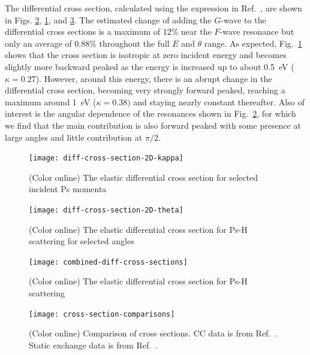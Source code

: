 \documentclass[preprint,showpacs,showkeys,preprintnumbers,amsmath,amssymb,longbibliography,pra,aps]{revtex4-1}
\begin{document}
The differential cross section, calculated using the expression in
Ref.~\cite{Bransden2003}, are shown in Figs.
\ref{fig:diff-cross-section-2D-theta}, \ref{fig:diff-cross-section-2D-kappa},
and \ref{fig:combined-diff-cross-sections}. The estimated change of adding
the $G$-wave to the differential cross sections is a maximum of $12\%$ near
the $F$-wave resonance but only an average of $0.88\%$ throughout the full
$E$ and $\theta$ range. As expected, 
Fig.~\ref{fig:diff-cross-section-2D-kappa} shows that the cross section is 
isotropic at zero incident energy and becomes slightly more backward peaked 
as the energy is increased up to about \mbox{0.5 eV} ($\kappa = 0.27$). 
However, around this energy, there is an abrupt change in the differential 
cross section, becoming very strongly forward peaked, reaching a maximum 
around \mbox{1 eV} ($\kappa = 0.38)$ and staying nearly constant thereafter. 
Also of interest is the angular dependence of the resonances shown in
Fig.~\ref{fig:diff-cross-section-2D-theta}, for which we find that the main 
contribution is also forward peaked with some presence at large angles and 
little contribution at $\pi/2$.

\begin{figure}[H]
	\centering
	\texttt{[image: diff-cross-section-2D-kappa]}
	\caption{(Color online) The elastic differential cross section for selected
incident Ps momenta}
	\label{fig:diff-cross-section-2D-kappa}
\end{figure}

\begin{figure}[H]
	\centering
	\texttt{[image: diff-cross-section-2D-theta]}
	\caption{(Color online) The elastic differential cross section for Ps-H
scattering for selected angles}
	\label{fig:diff-cross-section-2D-theta}
\end{figure}

\begin{figure}[H]
	\centering
	\texttt{[image: combined-diff-cross-sections]}
	\caption{(Color online) The elastic differential cross section for Ps-H
scattering}
	\label{fig:combined-diff-cross-sections}
\end{figure}

\begin{figure}[H]
	\centering
	\texttt{[image: cross-section-comparisons]}
	\caption{(Color online) Comparison of cross sections. CC data is from
Ref.~\cite{Blackwood2002}. Static exchange data is from Ref.~\cite{Hara1975}.}
	\label{fig:cross-section-comparisons}
\end{figure}
\end{document}
